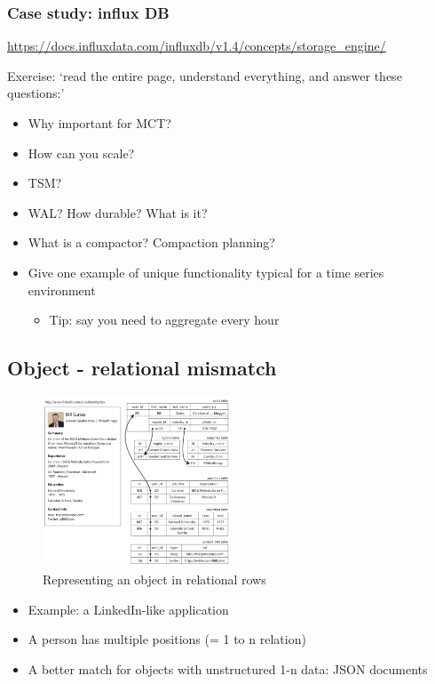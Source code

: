 \documentclass{article}
\begin{document}
\subsubsection{Case study: influx DB}

\url{https://docs.influxdata.com/influxdb/v1.4/concepts/storage_engine/}

Exercise: `read the entire page, understand everything, and answer these questions:'

\begin{itemize}
    \item Why important for MCT?
    \item How can you scale?
    \item TSM?
    \item WAL? How durable? What is it?
    \item What is a compactor? Compaction planning?
    \item Give one example of unique functionality typical for a time series environment
    \begin{itemize}
        \item Tip: say you need to aggregate every hour
    \end{itemize}
\end{itemize}

\subsection{Object - relational mismatch}

\begin{figure}[H]
    \centering
    \includegraphics[width=0.5\textwidth]{billgates.png}
    \caption{Representing an object in relational rows}
\end{figure}

\begin{itemize}
    \item Example: a LinkedIn-like application
    \item A person has multiple positions (= 1 to n relation)
    \item A better match for objects with unstructured 1-n data: JSON documents
\end{itemize}
\end{document}
